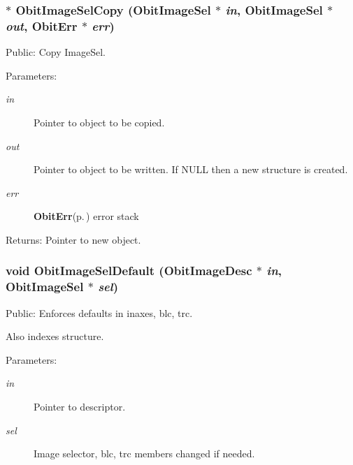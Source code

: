 \subsubsection{$\ast$ Obit\-Image\-Sel\-Copy ({\bf Obit\-Image\-Sel} $\ast$ {\em in}, {\bf Obit\-Image\-Sel} $\ast$ {\em out}, {\bf Obit\-Err} $\ast$ {\em err})}\label{ObitImageSel_8c_a8}


Public: Copy Image\-Sel. 

\begin{Desc}
\item[Parameters:]
\begin{description}
\item[{\em in}]Pointer to object to be copied. \item[{\em out}]Pointer to object to be written. If NULL then a new structure is created. \item[{\em err}]{\bf Obit\-Err}{\rm (p.\,\pageref{structObitErr})} error stack \end{description}
\end{Desc}
\begin{Desc}
\item[Returns:]Pointer to new object. \end{Desc}
\subsubsection{\setlength{\rightskip}{0pt plus 5cm}void Obit\-Image\-Sel\-Default ({\bf Obit\-Image\-Desc} $\ast$ {\em in}, {\bf Obit\-Image\-Sel} $\ast$ {\em sel})}\label{ObitImageSel_8c_a10}


Public: Enforces defaults in inaxes, blc, trc. 

Also indexes structure. \begin{Desc}
\item[Parameters:]
\begin{description}
\item[{\em in}]Pointer to descriptor. \item[{\em sel}]Image selector, blc, trc members changed if needed. \end{description}
\end{Desc}
